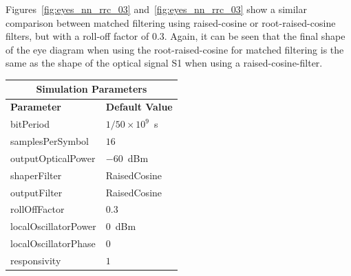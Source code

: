 \begin{refsection}
Figures~\ref{fig:eyes_nn_rrc_03} and~\ref{fig:eyes_nn_rrc_03} show a similar
comparison between matched filtering using raised-cosine or root-raised-cosine
filters, but with a roll-off factor of 0.3. Again, it can be seen that the
final shape of the eye diagram when using the root-raised-cosine for matched
filtering is the same as the shape of the optical signal S1 when using a
raised-cosine-filter.
\begin{table}[H]
	\centering
	\footnotesize
	\begin{tabular}{|l|l|}
		\hline
		\multicolumn{2}{|c|}{ \textbf{Simulation Parameters} } \\
		\hline
		\textbf{Parameter}     & \textbf{Default Value}                                     \\\hline
		bitPeriod              & $1/50\times10^9$~s														\\\hline
		samplesPerSymbol       & $16$                                                       \\\hline
		outputOpticalPower     & $-60$~dBm 													\\ \hline
		shaperFilter	       & RaisedCosine												\\ \hline
		outputFilter		   & RaisedCosine												\\ \hline
		rollOffFactor		   & 0.3														\\ \hline
		localOscillatorPower   & $0$~dBm                                                    \\ \hline
		localOscillatorPhase   & $0$                                                        \\ \hline
		responsivity           & $1$                                                        \\ \hline

\end{tabular}
\end{table}
\end{refsection}
